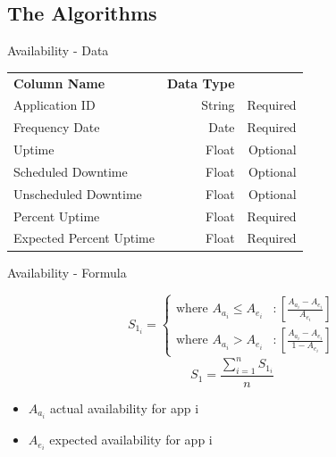 \subsection{The Algorithms}

\begin{frame}{Availability - Data}
    
    \begin{tabular}{l | r | r}
        \textbf{Column Name} & \textbf{Data Type} &  \\
        
        Application ID & String  & Required \\
        Frequency Date & Date & Required \\
        Uptime & Float & Optional \\
        Scheduled Downtime & Float & Optional \\
        Unscheduled Downtime & Float  & Optional \\
        Percent Uptime & Float & Required \\
        Expected Percent Uptime & Float & Required \\
    \end{tabular}
\end{frame}

\begin{frame}{Availability - Formula}
    
    \begin{displaymath}
       S_{1_i} = \left\{
         \begin{array}{lr}
           \text{where } A_{a_i} \leq A_{e_i} & : \left[ \frac{A_{a_i} - A_{e_i}}{A_{e_i}} \right] \\
           \text{where } A_{a_i} > A_{e_i}  & : \left[ \frac{A_{a_i} - A_{e_i} }{1-A_{e_i}} \right]
         \end{array}
       \right.
    \end{displaymath} 
    \[
        S_1 = \frac{\sum^n_{i=1}S_{1_i}}{n}
    \]

    \begin{itemize}
        \item $A_{a_i}$ actual availability for app i
        \item $A_{e_i}$ expected availability for app i
    \end{itemize}
\end{frame}

